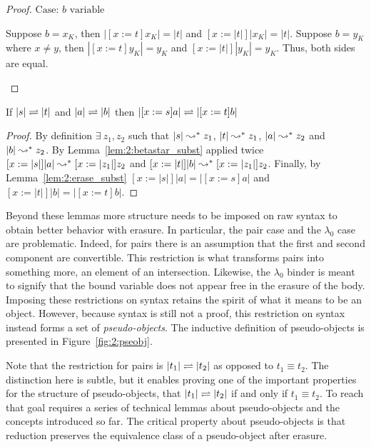 \begin{proof}
    $\text{Case: }b \text{ variable}$
    \begin{proofcase}
        Suppose $b = x_K$, then $|[x := t]x_K| = |t|$ and $[x := |t|]|x_K| = |t|$.
        Suppose $b = y_K$ where $x \neq y$, then $|[x := t]y_K| = y_K$ and $[x := |t|]|y_K| = y_K$.
        Thus, both sides are equal.
    \end{proofcase}
\end{proof}

\begin{lemma}
    \label{lem:2:betaconv_erased_subst}
    If $|s| \rightleftharpoons |t|$ and $|a| \rightleftharpoons |b|$ then $|[x := s]a| \rightleftharpoons |[x := t]b|$
\end{lemma}
\begin{proof}
    By definition $\exists\ z_1, z_2$ such that $|s| \leadsto^* z_1$, $|t| \leadsto^* z_1$, $|a| \leadsto^* z_2$ and $|b| \leadsto^* z_2$.
    By Lemma~\ref{lem:2:betastar_subst} applied twice $[x := |s|]|a| \leadsto^* [x := |z_1|]z_2$ and $[x := |t|]|b| \leadsto^* [x := |z_1|]z_2$.
    Finally, by Lemma~\ref{lem:2:erase_subst} $[x := |s|]|a| = |[x := s]a|$ and $[x := |t|]|b| = |[x := t]b|$.
\end{proof}

Beyond these lemmas more structure needs to be imposed on raw syntax to obtain better behavior with erasure.
In particular, the pair case and the $\lambda_0$ case are problematic.
Indeed, for pairs there is an assumption that the first and second component are convertible.
This restriction is what transforms pairs into something more, an element of an intersection.
Likewise, the $\lambda_0$ binder is meant to signify that the bound variable does not appear free in the erasure of the body.
Imposing these restrictions on syntax retains the spirit of what it means to be an object.
However, because syntax is still not a proof, this restriction on syntax instead forms a set of \textit{pseudo-objects}.
The inductive definition of pseudo-objects is presented in Figure~\ref{fig:2:pseobj}.



Note that the restriction for pairs is $|t_1| \rightleftharpoons |t_2|$ as opposed to $t_1 \equiv t_2$.
The distinction here is subtle, but it enables proving one of the important properties for the structure of pseudo-objects, that $|t_1| \rightleftharpoons |t_2|$ if and only if $t_1 \equiv t_2$.
To reach that goal requires a series of technical lemmas about pseudo-objects and the concepts introduced so far.
The critical property about pseudo-objects is that reduction preserves the equivalence class of a pseudo-object after erasure.

